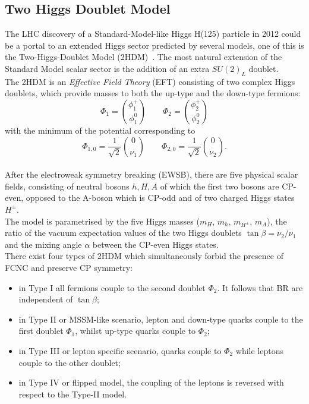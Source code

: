\subsection{Two Higgs Doublet Model}
The LHC discovery of a Standard-Model-like Higgs H(125) particle in 2012\cite{higgsDiscovery} could be a portal to an extended Higgs sector predicted by several models, one of this is the Two-Higgs-Doublet Model (2HDM)~\cite{h2dm}.
The most natural extension of the Standard Model scalar sector is the addition of an
extra $SU(2)_{L}$ doublet. 
\vspace{\baselineskip}
\\The 2HDM is an \textit{Effective Field Theory} (EFT\footnotemark) 
consisting of two complex Higgs doublets, which provide masses to both the up-type and the down-type fermions:
\begin{equation} 
	\Phi_{1}= \binom{\phi^{+}_{1}}{\phi^{0}_{1}}  \qquad \Phi_{2}= \binom{\phi^{+}_{2}}{\phi^{0}_{2}}
\end{equation}
with the minimum of the potential corresponding to
\begin{equation} 
	\Phi_{1,0}= \frac{1}{\sqrt{2}}\binom{0}{\nu_1}  \qquad \Phi_{2,0}= \frac{1}{\sqrt{2}}\binom{0}{\nu_2}.
\end{equation}
\\After the electroweak symmetry breaking (EWSB),
there are five physical scalar fields, consisting of neutral bosons $h,H,A$ of which the
first two bosons are CP-even, opposed to the A-boson which is CP-odd and of two charged Higgs states $H^{\pm}$.
\\The model is parametrised by the five Higgs masses ($m_H$, $m_h$, $m_{H^{\pm}}$, $m_A$), the ratio of the vacuum expectation 
values of the two Higgs doublets $\tan{\beta}= \nu_{2}/\nu_{1}$ and the mixing angle $\alpha$ between the CP-even Higgs states.
\\There exist four types of 2HDM which simultaneously forbid the presence of FCNC and preserve CP symmetry:
\begin{itemize}
	\item in Type I all fermions couple to the second doublet $\Phi_2$. It follows that BR are independent of $\tan{\beta}$;
	\item in Type II or MSSM-like scenario, lepton and down-type quarks couple to the first doublet $\Phi_1$, whilst up-type quarks couple to $\Phi_2$;
	\item in Type III or lepton specific scenario, quarks couple to  $\Phi_2$ while leptons couple to the other doublet;
	\item in Type IV or flipped model, the coupling of the leptons is reversed with respect to the Type-II model.
\end{itemize}	
	
